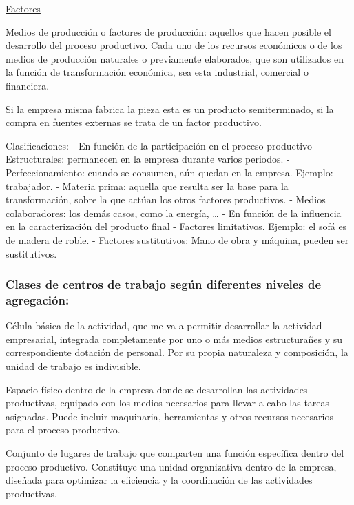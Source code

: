 \documentclass[12pt]{report} %
\begin{document}
\underline{Factores}

Medios de producción o factores de producción: aquellos que hacen
posible el desarrollo del proceso productivo. Cada uno de los recursos
económicos o de los medios de producción naturales o previamente
elaborados, que son utilizados en la función de transformación
económica, sea esta industrial, comercial o financiera.

Si la empresa misma fabrica la pieza esta es un producto semiterminado,
si la compra en fuentes externas se trata de un factor productivo.

Clasificaciones: - En función de la participación en el proceso
productivo - Estructurales: permanecen en la empresa durante varios
periodos. - Perfeccionamiento: cuando se consumen, aún quedan en la
empresa. Ejemplo: trabajador. - Materia prima: aquella que resulta ser
la base para la transformación, sobre la que actúan los otros factores
productivos. - Medios colaboradores: los demás casos, como la energía,
\ldots{} - En función de la influencia en la caracterización del
producto final - Factores limitativos. Ejemplo: el sofá es de madera de
roble. - Factores sustitutivos: Mano de obra y máquina, pueden ser
sustitutivos.

\subsubsection*{Clases de centros de trabajo según diferentes niveles de agregación:}

\begin{definicion}
Célula básica de la actividad, que me va a permitir desarrollar la actividad empresarial, integrada completamente por uno o más medios estructurañes y su correspondiente dotación de personal. Por su propia naturaleza y composición, la unidad de trabajo es indivisible.
\end{definicion}

\begin{definicion}
Espacio físico dentro de la empresa donde se desarrollan las actividades productivas, equipado con los medios necesarios para llevar a cabo las tareas asignadas. Puede incluir maquinaria, herramientas y otros recursos necesarios para el proceso productivo.
\end{definicion}

\begin{definicion}
Conjunto de lugares de trabajo que comparten una función específica dentro del proceso productivo. Constituye una unidad organizativa dentro de la empresa, diseñada para optimizar la eficiencia y la coordinación de las actividades productivas.
\end{definicion}
\end{document}
